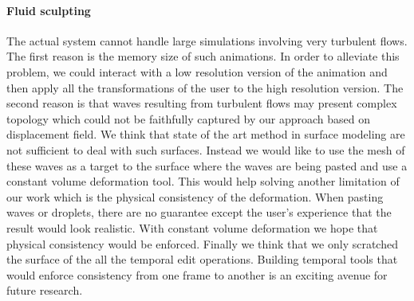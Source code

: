 \paragraph{Fluid sculpting} The actual system cannot handle large simulations involving very turbulent flows. 
The first reason is the memory size of such animations. 
In order to alleviate this problem, we could interact with a low resolution version of the animation and then apply all the transformations of the user to the high resolution version. 
The second reason is that waves resulting from turbulent flows may present complex topology which could not be faithfully captured by our approach based on displacement field.
We think that state of the art method in surface modeling are not sufficient to deal with such surfaces. 
Instead we would like to use the mesh of these waves as a target to the surface where the waves are being pasted and use a constant volume deformation tool. 
This would help solving another limitation of our work which is the physical consistency of the deformation. 
When pasting waves or droplets, there are no guarantee except the user's experience that the result would look realistic. 
With constant volume deformation we hope that physical consistency would be enforced. 
Finally we think that we only scratched the surface of the all the temporal edit operations. 
Building temporal tools that would enforce consistency from one frame to another is an exciting avenue for future research.

